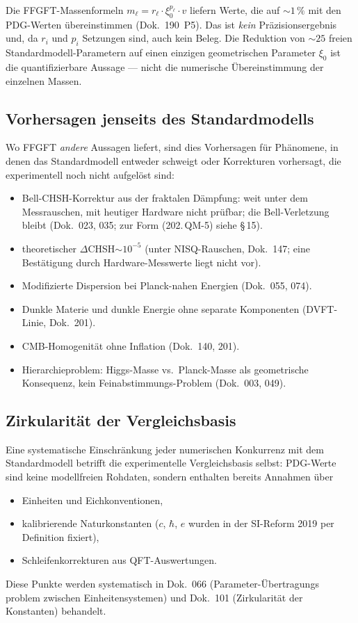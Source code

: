 Die FFGFT-Massenformeln $m_\ell = r_\ell\cdot\xi_0^{p_\ell}\cdot v$
liefern Werte, die auf $\sim 1\,\%$ mit den PDG-Werten übereinstimmen
(Dok.~190~P5). Das ist \emph{kein} Präzisionsergebnis und, da $r_i$
und $p_i$ Setzungen sind, auch kein Beleg. Die Reduktion von $\sim 25$ freien
Standardmodell-Parametern auf einen einzigen geometrischen Parameter
$\xi_0$ ist die quantifizierbare Aussage --- nicht die numerische
Übereinstimmung der einzelnen Massen.

\subsection*{Vorhersagen jenseits des Standardmodells}

Wo FFGFT \emph{andere} Aussagen liefert, sind dies Vorhersagen für
Phänomene, in denen das Standardmodell entweder schweigt oder
Korrekturen vorhersagt, die experimentell noch nicht aufgelöst sind:

\begin{itemize}\setlength\itemsep{0pt}
  \item Bell-CHSH-Korrektur aus der fraktalen Dämpfung: weit unter
        dem Messrauschen, mit heutiger Hardware nicht prüfbar; die
        Bell-Verletzung bleibt (Dok.~023, 035; zur Form (202.\,QM-5)
        siehe \S\,15).
  \item theoretischer $\Delta$CHSH$\sim 10^{-5}$ (unter NISQ-Rauschen,
        Dok.~147; eine Bestätigung durch Hardware-Messwerte liegt nicht vor).
  \item Modifizierte Dispersion bei Planck-nahen Energien
        (Dok.~055, 074).
  \item Dunkle Materie und dunkle Energie ohne separate Komponenten
        (DVFT-Linie, Dok.~201).
  \item CMB-Homogenität ohne Inflation (Dok.~140, 201).
  \item Hierarchieproblem: Higgs-Masse vs.\ Planck-Masse als
        geometrische Konsequenz, kein Feinabstimmungs-Problem
        (Dok.~003, 049).
\end{itemize}

\subsection*{Zirkularität der Vergleichsbasis}

Eine systematische Einschränkung jeder numerischen Konkurrenz mit dem
Standardmodell betrifft die experimentelle Vergleichsbasis selbst:
PDG-Werte sind keine modellfreien Rohdaten, sondern enthalten bereits
Annahmen über
\begin{itemize}\setlength\itemsep{0pt}
  \item Einheiten und Eichkonventionen,
  \item kalibrierende Naturkonstanten ($c$, $\hbar$, $e$ wurden in der
        SI-Reform 2019 per Definition fixiert),
  \item Schleifenkorrekturen aus QFT-Auswertungen.
\end{itemize}
Diese Punkte werden systematisch in Dok.~066 (Parameter-\"Ubertragungs%
problem zwischen Einheitensystemen) und Dok.~101 (Zirkularität der
Konstanten) behandelt.

